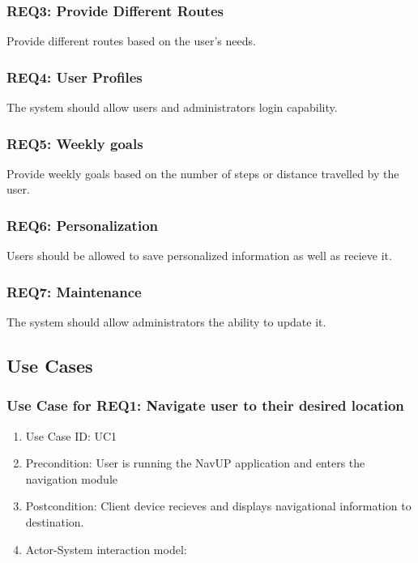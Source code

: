 \documentclass[11pt,a4paper]{report}
\begin{document}
		\subsubsection{REQ3: Provide Different Routes}
			Provide different routes based on the user's needs.
		
		\subsubsection{REQ4: User Profiles}
			The system should allow users and administrators login capability.
			
		\subsubsection{REQ5: Weekly goals}
			Provide weekly goals based on the number of steps or distance travelled by the user.
			
		\subsubsection{REQ6: Personalization}
			Users should be allowed to save personalized information as well as recieve it.
			
		\subsubsection{REQ7: Maintenance}
			The system should allow administrators the ability to update it.
			
	\subsection{Use Cases}
		\subsubsection{Use Case for REQ1: Navigate user to their desired location}
			\begin{enumerate}
			\renewcommand{\labelenumi}{{\textbf{\arabic{enumi}.}}}
			\item Use Case ID: UC1
			\item Precondition: User is running the NavUP application and enters the navigation module
			\item Postcondition: Client device recieves and displays navigational information to destination.
			\item Actor-System interaction model:
			\end{enumerate}
\end{document}
